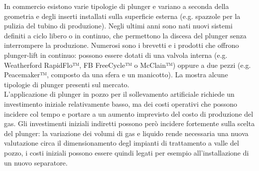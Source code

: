 In commercio esistono varie tipologie di plunger e variano a seconda della geometria e degli inserti installati sulla superficie esterna (e.g. spazzole per la pulizia del tubino di produzione). Negli ultimi anni sono nati nuovi sistemi definiti a ciclo libero o in continuo, che permettono la discesa del plunger senza interrompere la produzione. Numerosi sono i brevetti e i prodotti che offrono plunger-lift in continuo: possono essere dotati di una valvola interna (e.g. Weatherford RapidFlo™, FB FreeCycle™ o McClain™) oppure a due pezzi (e.g. Peacemaker™, composto da una sfera e un manicotto). La  mostra alcune tipologie di plunger presenti sul mercato.\\
L'applicazione di plunger in pozzo per il sollevamento artificiale richiede un investimento iniziale relativamente basso, ma dei costi operativi che possono incidere col tempo e portare a un aumento imprevisto del costo di produzione del gas. Gli investimenti iniziali indiretti possono però incidere fortemente sulla scelta del plunger: la variazione dei volumi di gas e liquido rende necessaria una nuova valutazione circa il dimensionamento degl impianti di trattamento a valle del pozzo, i costi iniziali possono essere quindi legati per esempio all'installazione di un nuovo separatore.

